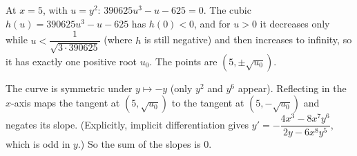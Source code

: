 At $x=5$, with $u=y^2$: $390625u^3-u-625=0$. The cubic $h(u)=390625u^3-u-625$ has $h(0)<0$, and for $u>0$ it decreases only while $u<\dfrac{1}{\sqrt{3\cdot390625}}$ (where $h$ is still negative) and then increases to infinity, so it has exactly one positive root $u_0$. The points are $(5,\pm\sqrt{u_0})$.

The curve is symmetric under $y\mapsto-y$ (only $y^2$ and $y^6$ appear). Reflecting in the $x$-axis maps the tangent at $(5,\sqrt{u_0})$ to the tangent at $(5,-\sqrt{u_0})$ and negates its slope. (Explicitly, implicit differentiation gives $y'=-\dfrac{4x^3-8x^7y^6}{2y-6x^8y^5}$, which is odd in $y$.) So the sum of the slopes is $\boxed{0}$.
